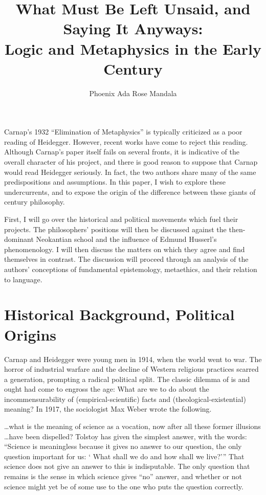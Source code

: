\documentclass[leqno, 12pt]{turabian-researchpaper}
\title{What Must Be Left Unsaid, and Saying It Anyways: \\ Logic and Metaphysics
in the Early \nth{20} Century}
\author{Phoenix Ada Rose Mandala}
\begin{document}
	\maketitle

	Carnap's 1932 \enquote{Elimination of Metaphysics} \nocite{carnap1966} is
	typically criticized as a poor reading of Heidegger. However, recent works
	have come to reject this reading. Although Carnap's paper itself fails on several
	fronts, it is indicative of the overall character of his project, and there is
	good reason to suppose that Carnap would read Heidegger seriously. In fact, the
	two authors share many of the same predispositions and assumptions. In this
	paper, I wish to explore these undercurrents, and to expose the origin of the
	difference between these giants of  century philosophy.

	First, I will go over the historical and political movements which fuel their
	projects. The philosophers' positions will then be discussed against the then-dominant
	Neokantian school and the influence of Edmund Husserl's phenomenology. I will then
	discuss the matters on which they agree and find themselves in contrast. The
	discussion will proceed through an analysis of the authors' conceptions of fundamental
	epistemology, metaethics, and their relation to language.

	\section{Historical Background, Political Origins}


	Carnap and Heidegger were young men in 1914, when the world went to war. The horror
	of industrial warfare and the decline of Western religious practices scarred a
	generation, prompting a radical political split. The classic dilemma of is and
	ought had come to engross the age: What are we to do about the
	incommensurability of (empirical-scientific) facts and (theological-existential)
	meaning? In 1917, the sociologist Max Weber wrote the following.

	\begin{displayquote}
		 \dots what is the meaning of science as a vocation,
		now after all these former illusions \dots have been dispelled? Tolstoy has given
		the simplest answer, with the words: \enquote{Science is meaningless because it gives %
		no answer to our question, the only question important for us: \enquote{%
		What shall we do and how shall we live?}}
		That science does not give an answer to this is indisputable. The only question
		that remains is the sense in which science gives \enquote{no} answer, and whether
		or not science might yet be of some use to the one who puts the question correctly.
	\end{displayquote}
\end{document}
